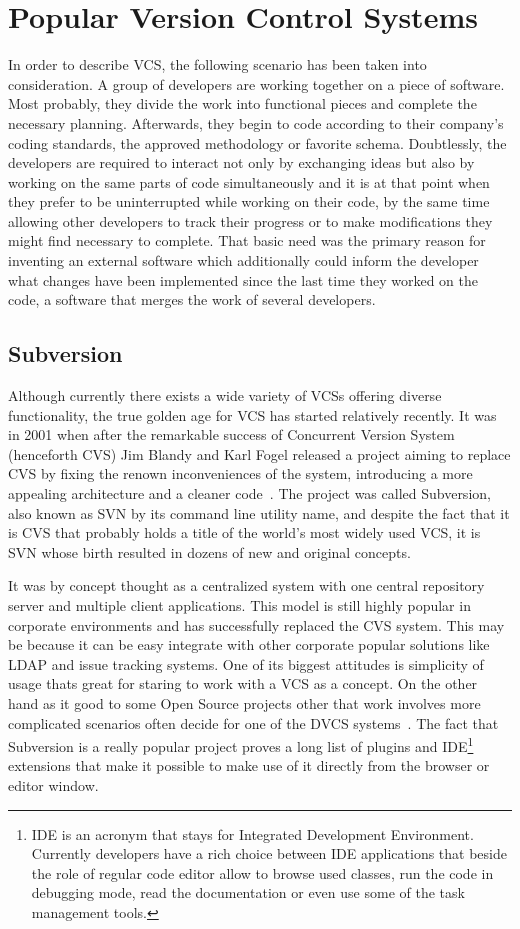 \section{Popular Version Control Systems}\label{sec:popular_vcs}
In order to describe VCS, the following scenario has been taken into consideration. A group of developers are working together on a piece of software. Most probably, they divide the work into functional pieces and complete the necessary planning. Afterwards, they begin to code according to their company's coding standards, the approved methodology or favorite schema. Doubtlessly, the developers are required to interact not only by exchanging ideas but also by working on the same parts of code simultaneously and it is at that point when they prefer to be uninterrupted while working on their code, by the same time allowing other developers to track their progress or to make modifications they might find necessary to complete. That basic need was the primary reason for inventing an external software which additionally could inform the developer what changes have been implemented since the last time they worked on the code, a software that merges the work of several developers. 

\subsection{Subversion}\label{subsec:svn}
Although currently there exists a wide variety of VCSs offering diverse functionality, the true golden age for VCS has started relatively recently. It was in 2001 when after the remarkable success of Concurrent Version System (henceforth CVS) Jim Blandy and Karl Fogel released a project aiming to replace CVS by fixing the renown inconveniences of the system, introducing a more appealing architecture and a cleaner code~\cite[page 11]{hg_book}. The project was called Subversion, also known as SVN by its command line utility name, and despite the fact that it is CVS that probably holds a title of the world's most widely used VCS, it is SVN whose birth resulted in dozens of new and original concepts.

It was by concept thought as a centralized system with one central repository server and multiple client applications. This model is still highly popular in corporate environments and has successfully replaced the CVS system. This may be because it can be easy integrate with other corporate popular solutions like LDAP and issue tracking systems. One of its biggest attitudes is simplicity of usage thats great for staring to work with a VCS as a concept. On the other hand as it good to some Open Source projects other that work involves more complicated scenarios often decide for one of the DVCS systems~\cite{linus_subversion}. The fact that Subversion is a really popular project proves a long list of plugins and IDE\footnote{IDE is an acronym that stays for Integrated Development Environment. Currently developers have a rich choice between IDE applications that beside the role of regular code editor allow to browse used classes, run the code in debugging mode, read the documentation or even use some of the task management tools.} extensions that make it possible to make use of it directly from the browser or editor window.  

